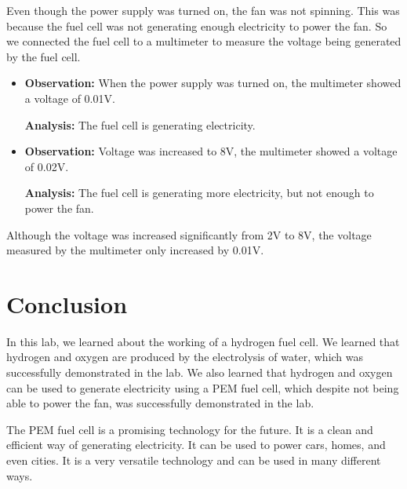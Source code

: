 \documentclass[a4paper, 12pt, english]{article}
\begin{document}
Even though the power supply was turned on, the fan was not spinning. This was
because the fuel cell was not generating enough electricity to power the fan.
So we connected the fuel cell to a multimeter to measure the voltage being
generated by the fuel cell.

\begin{itemize}
    \item \textbf{Observation:} When the power supply was turned on, the multimeter showed a voltage of 0.01V.

          \textbf{Analysis:} The fuel cell is generating electricity.

    \item \textbf{Observation:} Voltage was increased to 8V, the multimeter showed a voltage of 0.02V.

          \textbf{Analysis:} The fuel cell is generating more electricity, but not enough to power the fan.
\end{itemize}

Although the voltage was increased significantly from 2V to 8V, the voltage
measured by the multimeter only increased by 0.01V.

\section{Conclusion}
In this lab, we learned about the working of a hydrogen fuel cell. We learned
that hydrogen and oxygen are produced by the electrolysis of water, which was
successfully demonstrated in the lab. We also learned that hydrogen and oxygen
can be used to generate electricity using a PEM fuel cell, which despite not
being able to power the fan, was successfully demonstrated in the lab.

The PEM fuel cell is a promising technology for the future. It is a clean and
efficient way of generating electricity. It can be used to power cars, homes,
and even cities. It is a very versatile technology and can be used in many
different ways. 
\end{document}

